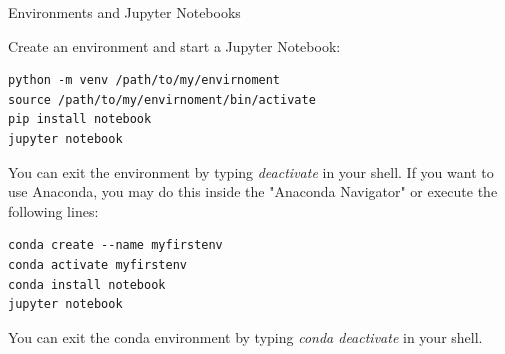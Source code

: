 \documentclass[twoside]{article}
\begin{document}
\maketitle

\begin{task}{Environments and Jupyter Notebooks}{}{}

Create an environment and start a Jupyter Notebook:

\begin{lstlisting}[numbers=none]
python -m venv /path/to/my/envirnoment
source /path/to/my/envirnoment/bin/activate
pip install notebook
jupyter notebook
\end{lstlisting}

You can exit the environment by typing \textit{deactivate} in your shell.
If you want to use Anaconda, you may do this inside the "Anaconda Navigator" or execute the following lines:

\begin{lstlisting}[numbers=none]
conda create --name myfirstenv
conda activate myfirstenv
conda install notebook
jupyter notebook
\end{lstlisting}

You can exit the conda environment by typing \textit{conda deactivate} in your shell.

\end{task}
\end{document}
